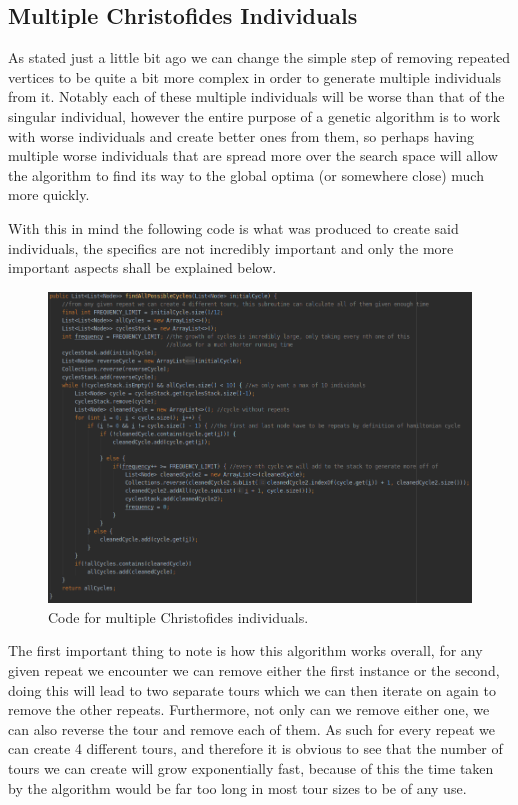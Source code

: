 \documentclass[11pt,a4paper,titlepage]{article}
\begin{document}
\subsection{Multiple Christofides Individuals}
As stated just a little bit ago we can change the simple step of removing repeated vertices to be quite a bit more complex in order to generate multiple individuals from it. Notably each of these multiple individuals will be worse than that of the singular individual, however the entire purpose of a genetic algorithm is to work with worse individuals and create better ones from them, so perhaps having multiple worse individuals that are spread more over the search space will allow the algorithm to find its way to the global optima (or somewhere close) much more quickly.

With this in mind the following code is what was produced to create said individuals, the specifics are not incredibly important and only the more important aspects shall be explained below.

\begin{figure}[ht]
	\includegraphics[scale=0.45]{MultiChrisAlg}
	\centering
	\caption{Code for multiple Christofides individuals.}
\end{figure}

The first important thing to note is how this algorithm works overall, for any given repeat we encounter we can remove either the first instance or the second, doing this will lead to two separate tours which we can then iterate on again to remove the other repeats. Furthermore, not only can we remove either one, we can also reverse the tour and remove each of them. As such for every repeat we can create 4 different tours, and therefore it is obvious to see that the number of tours we can create will grow exponentially fast, because of this the time taken by the algorithm would be far too long in most tour sizes to be of any use.
\end{document}
